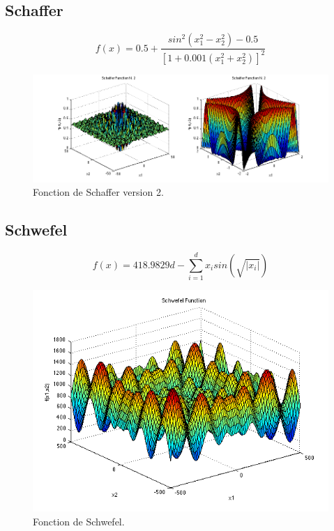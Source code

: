 \documentclass[a4paper, fontsize=11pt]{article}
\begin{document}
\subsection{Schaffer}
\begin{equation}
f(x) = 0.5 + \frac{sin^2(x_1^2 - x_2^2) - 0.5}{[1 + 0.001(x_1^2 + x_2^2)]^2}
\end{equation}

\begin{figure}[b]
\centering
\includegraphics[width=1\textwidth]{schaffer2.png}
\caption{\label{fig:frog}Fonction de Schaffer version 2.}
\end{figure}

\subsection{Schwefel}
\begin{equation}
f(x) = 418.9829d - \sum_{i=1}^{d} x_i sin(\sqrt{|x_i|})
\end{equation}

\begin{figure}[b]
\centering
\includegraphics[width=1\textwidth]{schwef.png}
\caption{\label{fig:frog}Fonction de Schwefel.}
\end{figure}
\end{document}
